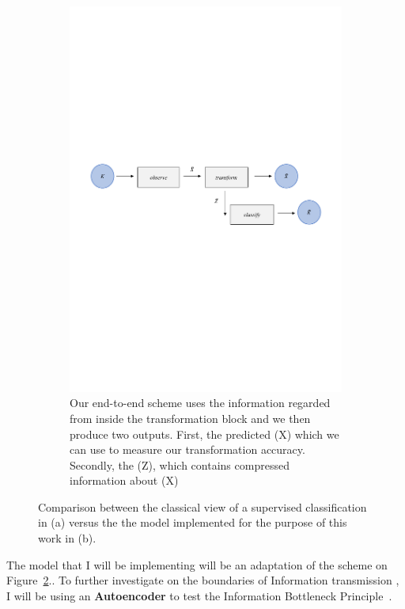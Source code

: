 \begin{figure}[H]
\begin{subfigure}{1\textwidth} 
  \centering
  \includegraphics[width=16.5cm]{Figuras_tfg/Figura1_1_tfg}
  \caption{Our end-to-end scheme uses the information regarded from inside the transformation block and we then produce two outputs. First, the predicted (X) which we can use to measure our transformation accuracy. Secondly, the (Z), which contains compressed information about (X)}
  \label{fig:fig1a} 
\end{subfigure}%
\caption{Comparison between the classical view of a supervised classification in (a) versus the the model implemented for the purpose of this work in (b).}
\label{fig:fig1}
\end{figure}


The model that I will be implementing will be an adaptation of the scheme on Figure~\ref{fig:fig1}.. To further investigate on the boundaries of Information transmission , I will be using an \textbf{Autoencoder} to test the Information Bottleneck Principle~\cite{refToInfBottleNeck}. 


